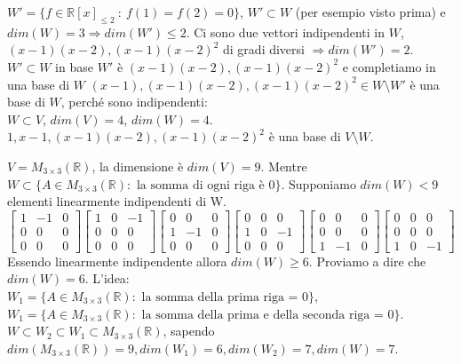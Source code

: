 \begin{example}
$W' = \{f \in \mathbb{R}[x]_{\leq 2} \::\: f(1) = f(2) = 0\}$, $W' \subset W$ (per esempio visto prima) e $dim(W) = 3 \Longrightarrow dim(W') \leq 2$. Ci sono due vettori indipendenti in $W$, $(x-1)(x-2), (x-1)(x-2)^2$ di gradi diversi $\Longrightarrow dim(W') = 2$.\\
$W' \subset W$ in base $W'$ è $(x-1)(x-2), (x-1)(x-2)^2$ e completiamo in una base di $W$ $(x-1), (x-1)(x-2), (x-1)(x-2)^2 \in W \setminus W'$ è una base di $W$, perché sono indipendenti:\\
$W \subset V$, $dim(V) = 4$, $dim(W) = 4$. $1, x-1, (x-1)(x-2), (x-1)(x-2)^2$ è una base di $V \setminus W$.
\end{example}

\begin{example}
$V = M_{3\times3}(\mathbb{R})$, la dimensione è $dim(V) = 9$. Mentre $W \subset \{ A \in M_{3\times 3}(\mathbb{R}): \text{ la somma di ogni riga è 0}\}$. Supponiamo $dim(W) < 9$ elementi linearmente indipendenti di W.
\[
\begin{bmatrix}
1 & -1 & 0\\
0 & 0 & 0\\
0 & 0 & 0
\end{bmatrix}
\begin{bmatrix}
1 & 0 & -1\\
0 & 0 & 0\\
0 & 0 & 0
\end{bmatrix}
\begin{bmatrix}
0 & 0 & 0\\
1 & -1 & 0\\
0 & 0 & 0
\end{bmatrix}
\begin{bmatrix}
0 & 0 & 0\\
1 & 0 & -1\\
0 & 0 & 0
\end{bmatrix}
\begin{bmatrix}
0 & 0 & 0\\
0 & 0 & 0\\
1 & -1 & 0
\end{bmatrix}
\begin{bmatrix}
0 & 0 & 0\\
0 & 0 & 0\\
1 & 0 & -1
\end{bmatrix}
\]
Essendo linearmente indipendente allora $dim(W) \geq 6$. Proviamo a dire che $dim(W) = 6$. L'idea:\\
$W_1 = \{A \in M_{3 \times 3}(\mathbb{R}) : \text{ la somma della prima riga = 0}\}$,\\ $W_1 = \{A \in M_{3 \times 3}(\mathbb{R}) : \text{ la somma della prima e della seconda riga = 0}\}$.\\
$W \subset W_2 \subset W_1 \subset M_{3\times3}(\mathbb{R})$, sapendo $dim(M_{3\times3}(\mathbb{R})) = 9, dim(W_1) = 6, dim(W_2) = 7, dim(W) = 7$.
\end{example}

